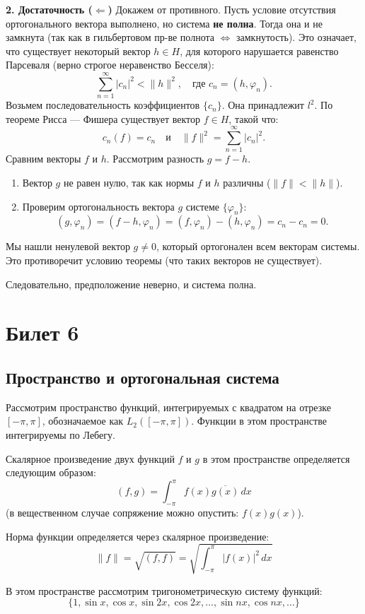 \documentclass[12pt,a4paper,openany]{book}
\begin{document}
\textbf{2. Достаточность ($\Leftarrow$)}
Докажем от противного.
Пусть условие отсутствия ортогонального вектора выполнено, но система \textbf{не полна}.
Тогда она и не замкнута (так как в гильбертовом пр-ве полнота $\Leftrightarrow$ замкнутость).
Это означает, что существует некоторый вектор $h \in H$, для которого нарушается равенство Парсеваля (верно строгое неравенство Бесселя):
\[
\sum_{n=1}^\infty |c_n|^2 < \|h\|^2, \quad \text{где } c_n = (h, \varphi_n).
\]
Возьмем последовательность коэффициентов $\{c_n\}$. Она принадлежит $l^2$.
По теореме Рисса — Фишера существует вектор $f \in H$, такой что:
\[
c_n(f) = c_n \quad \text{и} \quad \|f\|^2 = \sum_{n=1}^\infty |c_n|^2.
\]
Сравним векторы $f$ и $h$. Рассмотрим разность $g = f - h$.
\begin{enumerate}
    \item Вектор $g$ не равен нулю, так как нормы $f$ и $h$ различны ($\|f\| < \|h\|$).
    \item Проверим ортогональность вектора $g$ системе $\{\varphi_n\}$:
    \[
    (g, \varphi_n) = (f - h, \varphi_n) = (f, \varphi_n) - (h, \varphi_n) = c_n - c_n = 0.
    \]
\end{enumerate}
Мы нашли ненулевой вектор $g \neq 0$, который ортогонален всем векторам системы.
Это противоречит условию теоремы (что таких векторов не существует).

Следовательно, предположение неверно, и система полна.

\chapter{Билет 6}
\section{Пространство  и ортогональная система}

Рассмотрим пространство функций, интегрируемых с квадратом на отрезке $[-\pi, \pi]$, обозначаемое как $L_2([-\pi, \pi])$. Функции в этом пространстве интегрируемы по Лебегу.

Скалярное произведение двух функций $f$ и $g$ в этом пространстве определяется следующим образом:
$$
(f, g) = \int_{-\pi}^{\pi} f(x) \overline{g(x)} \, dx
$$
(в вещественном случае сопряжение можно опустить: $f(x)g(x)$).

Норма функции определяется через скалярное произведение:
$$
\|f\| = \sqrt{(f, f)} = \sqrt{\int_{-\pi}^{\pi} |f(x)|^2 \, dx}
$$

В этом пространстве рассмотрим тригонометрическую систему функций:
$$
\{ 1, \sin x, \cos x, \sin 2x, \cos 2x, \dots, \sin nx, \cos nx, \dots \}
$$
\end{document}
